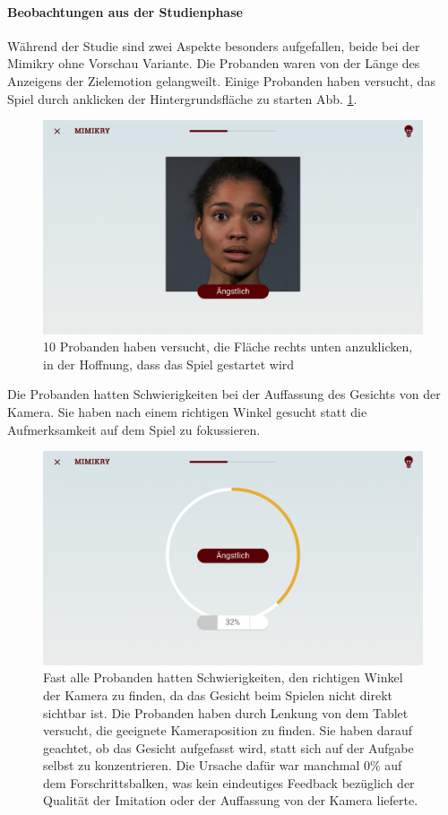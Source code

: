 \paragraph{Beobachtungen aus der Studienphase}
Während der Studie sind zwei Aspekte besonders aufgefallen, beide bei der Mimikry ohne Vorschau Variante.
Die Probanden waren von der Länge des Anzeigens der Zielemotion gelangweilt. Einige Probanden haben versucht, das Spiel durch anklicken der Hintergrundsfläche zu starten Abb. \ref{knopf}. 
\begin{figure}[!ht]
    \centering\includegraphics[width=330pt]{res/TASK_MIMIKRY_IIIa.png}
\caption{10 Probanden haben versucht, die Fläche rechts unten anzuklicken, in der Hoffnung, dass das Spiel gestartet wird}
\label{knopf}
\end{figure}
Die Probanden hatten Schwierigkeiten bei der Auffassung des Gesichts von der Kamera. Sie haben nach einem richtigen Winkel gesucht statt die Aufmerksamkeit auf dem Spiel zu fokussieren. 
\begin{figure}
    \centering\includegraphics[width=330pt]{res/TASK_MIMIKRY_IIIb.png}
\caption{Fast alle Probanden hatten Schwierigkeiten, den richtigen Winkel der Kamera zu finden, da das Gesicht beim Spielen nicht direkt sichtbar ist. Die Probanden haben durch Lenkung von dem Tablet versucht, die geeignete Kameraposition zu finden. Sie haben darauf geachtet, ob das Gesicht aufgefasst wird, statt sich auf der Aufgabe selbst zu konzentrieren. Die Ursache dafür war manchmal 0\% auf dem Forschrittsbalken, was kein eindeutiges Feedback bezüglich der Qualität der Imitation oder der Auffassung von der Kamera lieferte. }
\label{winkel}
\end{figure}


